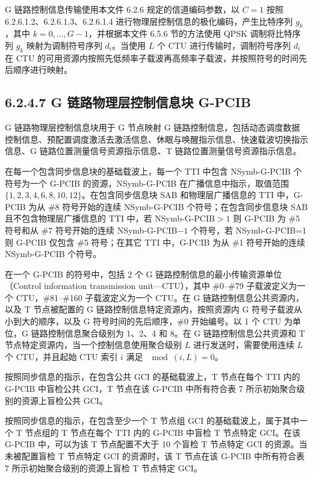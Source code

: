 \documentclass[11pt,a4paper]{ctexart}
\begin{document}
G 链路控制信息传输使用本文件 6.2.6 规定的信道编码参数，以 $C = 1$ 按照 6.2.6.1.2、6.2.6.1.3、6.2.6.1.4 进行物理层控制信息的极化编码，产生比特序列 $g_k$，其中 $k = 0, \ldots, G-1$，并根据本文件 6.5.6 节的方法使用 QPSK 调制将比特序列 $g_k$ 映射为调制符号序列 $d_i$。当使用 $L$ 个 CTU 进行传输时，调制符号序列 $d_i$ 在 CTU 的可用资源内按照先低频率子载波再高频率子载波，并按照符号的时间先后顺序进行映射。

\subsection{6.2.4.7 G 链路物理层控制信息块 G-PCIB}

G 链路物理层控制信息块用于 G 节点映射 G 链路控制信息，包括动态调度数据控制信息、预配置调度激活去激活信息、休眠与唤醒指示信息、快速载波切换指示信息、G 链路位置测量信号资源指示信息、T 链路位置测量信号资源指示信息。

在每一个包含同步信息块的基础载波上，每一个 TTI 中包含 NSymb-G-PCIB 个符号为一个 G-PCIB 的资源，NSymb-G-PCIB 在广播信息中指示，取值范围 $\{1, 2, 3, 4, 6, 8, 10, 12\}$。在包含同步信息块 SAB 和物理层广播信息的 TTI 中，G-PCIB 为从 \#8 符号开始的连续 NSymb-G-PCIB 个符号；在包含同步信息块 SAB 且不包含物理层广播信息的 TTI 中，若 NSymb-G-PCIB$>1$ 则 G-PCIB 为 \#5 符号和从 \#7 符号开始的连续 NSymb-G-PCIB$-1$ 个符号，若 NSymb-G-PCIB=1 则 G-PCIB 仅包含 \#5 符号；在其它 TTI 中，G-PCIB 为从 \#1 符号开始的连续 NSymb-G-PCIB 个符号。

在一个 G-PCIB 的符号中，包括 2 个 G 链路控制信息的最小传输资源单位（Control information transmission unit---CTU），其中 \#0--\#79 子载波定义为一个 CTU，\#81--\#160 子载波定义为一个 CTU。在 G 链路控制信息公共资源内，以及 T 节点被配置的 G 链路控制信息特定资源内，按照资源内 G 符号子载波从小到大的顺序，以及 G 符号时间的先后顺序，\#0 开始编号。以 1 个 CTU 为单位，G 链路控制信息聚合级别为 1、2、4 和 8。在 G 链路控制信息公共资源和 T 节点特定资源内，当一个控制信息使用聚合级别 $L$ 进行发送时，需要使用连续 $L$ 个 CTU，并且起始 CTU 索引 $i$ 满足 $\mod(i, L) = 0$。

按照同步信息的指示，在包含公共 GCI 的基础载波上，T 节点在每个 TTI 内的 G-PCIB 中盲检公共 GCI，T 节点在该 G-PCIB 中所有符合表 7 所示初始聚合级别的资源上盲检公共 GCI。

按照同步信息的指示，在包含至少一个 T 节点组 GCI 的基础载波上，属于其中一个 T 节点组的 T 节点在每个 TTI 内的 G-PCIB 中盲检 T 节点特定 GCI。在该 G-PCIB 中，可以为该 T 节点配置不大于 10 个盲检 T 节点特定 GCI 的资源。当未被配置盲检 T 节点特定 GCI 的资源时，该 T 节点在该 G-PCIB 中所有符合表 7 所示初始聚合级别的资源上盲检 T 节点特定 GCI。
\end{document}
